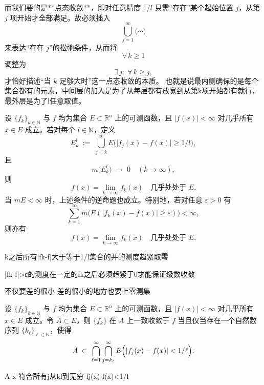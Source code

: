 \documentclass[lang=cn,10pt]{elegantbook}
\begin{document}
而我们要的是**点态收敛**，即对任意精度 \(1/l\) 只需“存在”某个起始位置 \(j\)，从第 \(j\) 项开始才全部满足。故必须插入
\[
\bigcup_{j=1}^{\infty}\bigl(\cdots\bigr)
\]
来表达“存在 \(j\)”的松弛条件，从而将
\[
\forall\,k\ge1
\]
调整为
\[
\exists\,j:\;\forall\,k\ge j,
\]
才恰好描述“当 \(k\) 足够大时”这一点态收敛的本质。
也就是说最内侧确保的是每个集合都有的元素，中间层的加入是为了从每层都有放宽到从第k项开始都有就行，最外层是为了l任意取值。
\begin{theorem}[几乎处处收敛的条件]\label{thm:ae-convergence}
设 $\{f_k\}_{k\in\mathbb{N}}$ 与 $f$ 均为集合 $E\subset\mathbb{R}^n$ 上的可测函数，且 $|f(x)|<\infty$ 对几乎所有 $x\in E$ 成立。若对每个 $l\in\mathbb{N}$，定义
\[
E_k^l \;:=\;\bigcup_{j=k}^{\infty}E\bigl(\lvert f_j(x)-f(x)\rvert\ge 1/l\bigr),
\]
且
\[
m\bigl(E_k^l\bigr)\;\longrightarrow\;0
\quad (k\to\infty),
\]
则
\[
f(x)=\lim_{k\to\infty}f_k(x)
\quad\text{几乎处处于 }E.
\]
当 $mE<\infty$ 时，上述条件的逆命题也成立。特别地，若对任意 $\varepsilon>0$ 有
\[
\sum_{k=1}^{\infty}m\bigl(E(\lvert f_k(x)-f(x)\rvert\ge \varepsilon)\bigr)
<\infty,
\]
则亦有
\[
f(x)=\lim_{k\to\infty}f_k(x)
\quad\text{几乎处处于 }E.
\]
\end{theorem}
k之后所有|fk-f|大于等于1/l集合的并的测度趋紧取零

|fk-f|>ε的测度在一定的fk之后必须趋紧于0才能保证级数收敛

不仅要差的很小 差的很小的地方也要上零测集
\begin{theorem}[一致收敛的条件]\label{thm:uniform-convergence}
设 $\{f_k\}_{k\in\mathbb{N}}$ 与 $f$ 均为集合 $E\subset\mathbb{R}^n$ 上的可测函数，且 $|f(x)|<\infty$ 对几乎所有 $x\in E$ 成立。令 $A\subset E$，则 $\{f_k\}$ 在 $A$ 上一致收敛于 $f$ 当且仅当存在一个自然数序列 $\{k_\ell\}_{\ell\in\mathbb{N}}$，使得
\[
A\;\subset\;\bigcap_{\ell=1}^{\infty}
\bigcap_{j=k_\ell}^{\infty}
E\Bigl(\lvert f_j(x)-f(x)\rvert<1/\ell\Bigr).
\]
\end{theorem}
A x 符合所有j从kl到无穷 fj(x)-f(x)<1/l 
\end{document}
